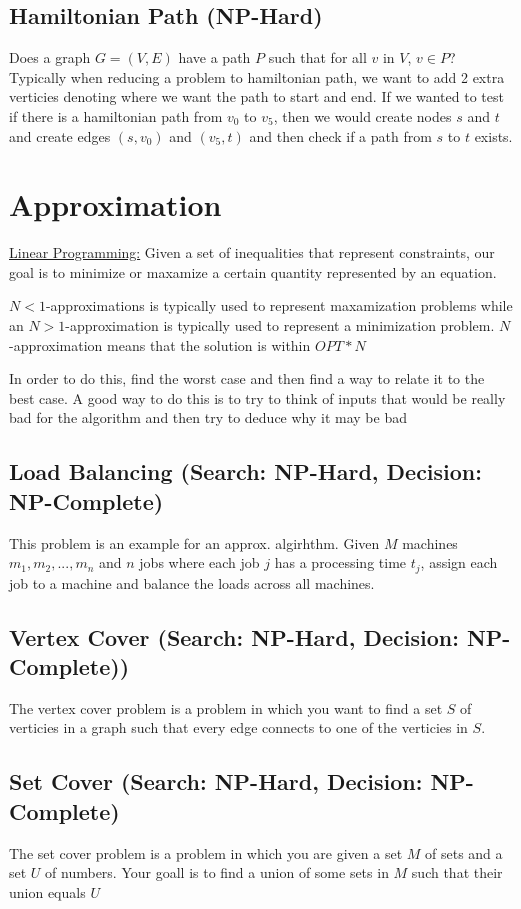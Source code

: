 \documentclass{article}
\begin{document}
\subsection{Hamiltonian Path (NP-Hard)}
Does a graph $G = (V, E)$ have a path $P$ such that for all $v$ in $V$, $v \in P$?
Typically when reducing a problem to hamiltonian path, we want to add 2 extra verticies denoting
where we want the path to start and end. If we wanted to test if there is a hamiltonian path from 
$v_0$ to $v_5$, then we would create nodes $s$ and $t$ and create edges $(s, v_0)$ and $(v_5, t)$
and then check if a path from $s$ to $t$ exists.

\section{Approximation}
\underline{Linear Programming:} Given a set of inequalities that represent constraints, our
goal is to minimize or maxamize a certain quantity represented 
by an equation.

$N<1$-approximations is typically used to represent maxamization problems while
an $N>1$-approximation is typically used to represent a minimization problem. 
$N$-approximation means that the solution is within $OPT*N$

In order to do this, find the worst case and then find a way to relate it to the best case.
A good way to do this is to try to think of inputs that would be really bad for the algorithm
and then try to deduce why it may be bad

\subsection{Load Balancing (Search: NP-Hard, Decision: NP-Complete)}
This problem is an example for an approx. algirhthm. Given $M$ machines $m_1, m_2, ..., m_n$ and $n$ jobs where each job $j$ has a processing time
$t_j$, assign each job to a machine and balance the loads across all machines.

\subsection{Vertex Cover (Search: NP-Hard, Decision: NP-Complete))}
The vertex cover problem is a problem in which you want to find a set $S$ of verticies in a graph such that
every edge connects to one of the verticies in $S$.

\subsection{Set Cover (Search: NP-Hard, Decision: NP-Complete)}
The set cover problem is a problem in which you are given a set $M$ of sets and a set $U$ of numbers. Your
goall is to find a union of some sets in $M$ such that their union equals $U$
\end{document}
